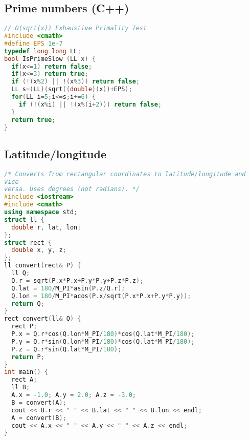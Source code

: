 \subsection{Prime numbers (C++)}
\begin{lstlisting}[language=C++]
// O(sqrt(x)) Exhaustive Primality Test
#include <cmath>
#define EPS 1e-7
typedef long long LL;
bool IsPrimeSlow (LL x) {
  if(x<=1) return false;
  if(x<=3) return true;
  if (!(x%2) || !(x%3)) return false;
  LL s=(LL)(sqrt((double)(x))+EPS);
  for(LL i=5;i<=s;i+=6) {
    if (!(x%i) || !(x%(i+2))) return false;
  }
  return true;
}
\end{lstlisting}
\subsection{Latitude/longitude}
\begin{lstlisting}[language=C++]
/* Converts from rectangular coordinates to latitude/longitude and 
vice
versa. Uses degrees (not radians). */
#include <iostream>
#include <cmath>
using namespace std;
struct ll {
  double r, lat, lon;
};
struct rect {
  double x, y, z;
};
ll convert(rect& P) {
  ll Q;
  Q.r = sqrt(P.x*P.x+P.y*P.y+P.z*P.z);
  Q.lat = 180/M_PI*asin(P.z/Q.r);
  Q.lon = 180/M_PI*acos(P.x/sqrt(P.x*P.x+P.y*P.y));
  return Q;
}
rect convert(ll& Q) {
  rect P;
  P.x = Q.r*cos(Q.lon*M_PI/180)*cos(Q.lat*M_PI/180);
  P.y = Q.r*sin(Q.lon*M_PI/180)*cos(Q.lat*M_PI/180);
  P.z = Q.r*sin(Q.lat*M_PI/180);
  return P;
}
int main() {
  rect A;
  ll B;
  A.x = -1.0; A.y = 2.0; A.z = -3.0;
  B = convert(A);
  cout << B.r << " " << B.lat << " " << B.lon << endl;
  A = convert(B);
  cout << A.x << " " << A.y << " " << A.z << endl;
}

\end{lstlisting}
